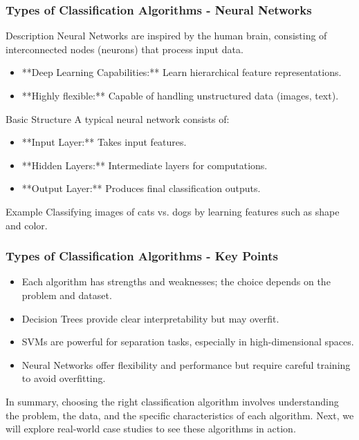 \documentclass{beamer}
\begin{document}
\begin{frame}[fragile]
    \frametitle{Types of Classification Algorithms - Neural Networks}
    \begin{block}{Description}
    Neural Networks are inspired by the human brain, consisting of interconnected nodes (neurons) that process input data.
    \end{block}

    \begin{itemize}
        \item **Deep Learning Capabilities:** Learn hierarchical feature representations.
        \item **Highly flexible:** Capable of handling unstructured data (images, text).
    \end{itemize}

    \begin{block}{Basic Structure}
    A typical neural network consists of:
    \begin{itemize}
        \item **Input Layer:** Takes input features.
        \item **Hidden Layers:** Intermediate layers for computations.
        \item **Output Layer:** Produces final classification outputs.
    \end{itemize}
    \end{block}

    \begin{block}{Example}
    Classifying images of cats vs. dogs by learning features such as shape and color.
    \end{block}
\end{frame}

\begin{frame}[fragile]
    \frametitle{Types of Classification Algorithms - Key Points}
    \begin{itemize}
        \item Each algorithm has strengths and weaknesses; the choice depends on the problem and dataset.
        \item Decision Trees provide clear interpretability but may overfit.
        \item SVMs are powerful for separation tasks, especially in high-dimensional spaces.
        \item Neural Networks offer flexibility and performance but require careful training to avoid overfitting.
    \end{itemize}
    
    In summary, choosing the right classification algorithm involves understanding the problem, the data, and the specific characteristics of each algorithm. Next, we will explore real-world case studies to see these algorithms in action.
\end{frame}
\end{document}
